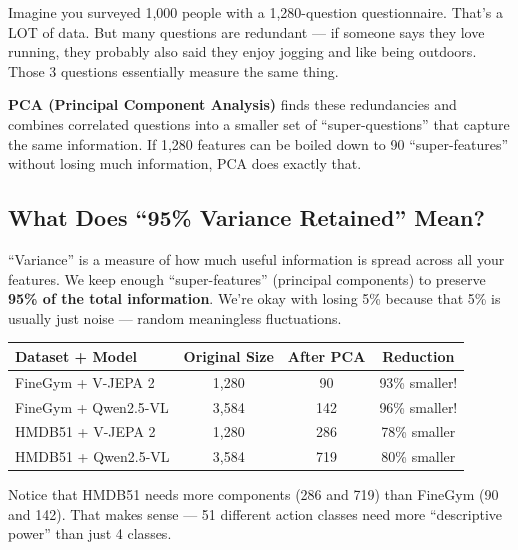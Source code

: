 \documentclass[12pt, a4paper]{article}
\begin{document}
\begin{analogybox}
Imagine you surveyed 1,000 people with a 1,280-question questionnaire. That's a LOT of data. But many questions are redundant — if someone says they love running, they probably also said they enjoy jogging and like being outdoors. Those 3 questions essentially measure the same thing.

\textbf{PCA (Principal Component Analysis)} finds these redundancies and combines correlated questions into a smaller set of ``super-questions'' that capture the same information. If 1,280 features can be boiled down to 90 ``super-features'' without losing much information, PCA does exactly that.
\end{analogybox}

\subsection{What Does ``95\% Variance Retained'' Mean?}

\begin{keybox}
``Variance'' is a measure of how much useful information is spread across all your features. We keep enough ``super-features'' (principal components) to preserve \textbf{95\% of the total information}. We're okay with losing 5\% because that 5\% is usually just noise — random meaningless fluctuations.
\end{keybox}

\begin{examplebox}
\begin{center}
\renewcommand{\arraystretch}{1.3}
\begin{tabular}{lccc}
\toprule
\textbf{Dataset + Model} & \textbf{Original Size} & \textbf{After PCA} & \textbf{Reduction} \\
\midrule
FineGym + V-JEPA 2 & 1,280 & 90 & 93\% smaller! \\
FineGym + Qwen2.5-VL & 3,584 & 142 & 96\% smaller! \\
HMDB51 + V-JEPA 2 & 1,280 & 286 & 78\% smaller \\
HMDB51 + Qwen2.5-VL & 3,584 & 719 & 80\% smaller \\
\bottomrule
\end{tabular}
\end{center}
Notice that HMDB51 needs more components (286 and 719) than FineGym (90 and 142). That makes sense — 51 different action classes need more ``descriptive power'' than just 4 classes.
\end{examplebox}
\end{document}
